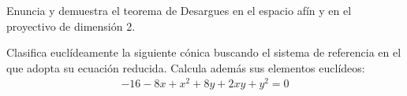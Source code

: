 \documentclass[12pt]{article}
\begin{document}
    \begin{ejercicio}[2,5 puntos]
        Enuncia y demuestra el teorema de Desargues en el espacio afín y en el proyectivo de dimensión 2.
    \end{ejercicio}

    \begin{ejercicio}[2,5 puntos]
        Clasifica euclídeamente la siguiente cónica buscando el sistema de referencia en el que adopta su ecuación reducida. Calcula además sus elementos euclídeos:
        \begin{gather*}
            -16-8x+x^2+8y+2xy+y^2=0
        \end{gather*}
    \end{ejercicio}
     
\end{document}
